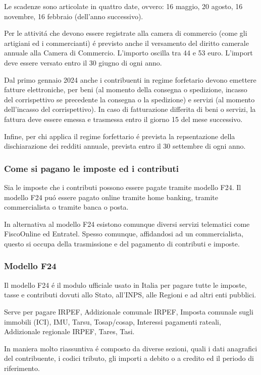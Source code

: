 \documentclass{article}
\begin{document}
Le scadenze sono articolate in quattro date, ovvero: 16 maggio, 20 agosto, 16 novembre, 16 febbraio (dell'anno successivo).

Per le attivit\'a che devono essere registrate alla camera di commercio (come gli artigiani ed i commercianti) \'e previsto anche il versamento del diritto camerale annuale alla Camera di Commercio. L'importo oscilla tra 44 e 53 euro. L'import deve essere versato entro il 30 giugno di ogni anno.

Dal primo gennaio 2024 anche i contribuenti in regime forfetario devono emettere fatture elettroniche, per beni (al momento della consegna o spedizione, incasso del corrispettivo se precedente la consegna o la spedizione)
e servizi (al momento dell'incasso del corrispettivo). In caso di fatturazione differita di beni o servizi, la fattura deve essere emessa e trasmessa entro il giorno 15 del mese successivo.

Infine, per chi applica il regime forfettario \'e prevista la repsentazione della dischiarazione dei redditi annuale, prevista entro il 30 settembre di ogni anno. 

\subsubsection{Come si pagano le imposte ed i contributi}
Sia le imposte che i contributi possono essere pagate tramite modello F24. 
Il modello F24 pu\'o essere pagato online tramite home banking, tramite commercialista o tramite banca o posta.

In alternativa al modello F24 esistono comunque diversi servizi telematici come FiscoOnline ed Entratel. Spesso comunque, affidandosi ad un commercialista, questo si occupa della trasmissione e del pagamento di contributi e imposte.

\subsubsection{Modello F24}
Il modello F24 \'e il modulo ufficiale usato in Italia per pagare tutte le imposte, tasse e contributi dovuti allo Stato, all'INPS, alle Regioni e ad altri enti pubblici.

Serve per pagare IRPEF, Addizionale comunale IRPEF, Imposta comunale sugli immobili (ICI), IMU, Tarsu, Tosap/cosap, Interessi pagamenti rateali, Addizionale regionale IRPEF, Tares, Tasi.

In maniera molto riassuntiva \'e composto da diverse sezioni, quali i dati anagrafici del contribuente, i codici tributo, gli importi a debito o a credito ed il periodo di riferimento.
\end{document}
